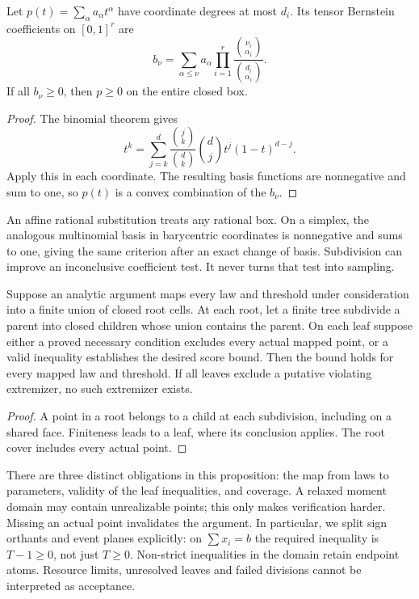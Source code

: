 \begin{lemma}\label{j:cert:bernstein}
Let $p(t)=\sum_\alpha a_\alpha t^\alpha$ have coordinate degrees
at most $d_i$. Its tensor Bernstein coefficients on $[0,1]^r$ are
\[
 b_\nu=\sum_{\alpha\le\nu}a_\alpha
       \prod_{i=1}^r\frac{\binom{\nu_i}{\alpha_i}}{\binom{d_i}{\alpha_i}}.
\]
If all $b_\nu\ge0$, then $p\ge0$ on the entire closed box.
\end{lemma}
\begin{proof}
The binomial theorem gives
\[
 t^k=\sum_{j=k}^d\frac{\binom jk}{\binom dk}
                       \binom dj t^j(1-t)^{d-j}.
\]
Apply this in each coordinate. The resulting basis functions are
nonnegative and sum to one, so $p(t)$ is a convex combination of
the $b_\nu$.
\end{proof}
An affine rational substitution treats any rational box. On a simplex,
the analogous multinomial basis in barycentric coordinates is
nonnegative and sums to one, giving the same criterion after an exact
change of basis. Subdivision can improve an inconclusive coefficient
test. It never turns that test into sampling.

\begin{proposition}\label{j:cert:cover}
Suppose an analytic argument maps every law and threshold under
consideration into a finite union of closed root cells. At each root,
let a finite tree subdivide a parent into closed children whose union
contains the parent. On each leaf suppose either a proved necessary
condition excludes every actual mapped point, or a valid inequality
establishes the desired score bound. Then the bound holds for every
mapped law and threshold. If all leaves exclude a putative violating
extremizer, no such extremizer exists.
\end{proposition}
\begin{proof}
A point in a root belongs to a child at each subdivision, including on
a shared face. Finiteness leads to a leaf, where its conclusion
applies. The root cover includes every actual point.
\end{proof}

There are three distinct obligations in this proposition: the map from
laws to parameters, validity of the leaf inequalities, and coverage.
A relaxed moment domain may contain unrealizable points; this only
makes verification harder. Missing an actual point invalidates the
argument. In particular, we split sign orthants and event planes
explicitly: on $\sum x_i=b$ the required inequality is $T-1\ge0$,
not just $T\ge0$. Non-strict inequalities in the domain retain endpoint
atoms. Resource limits, unresolved leaves and failed divisions cannot
be interpreted as acceptance.

